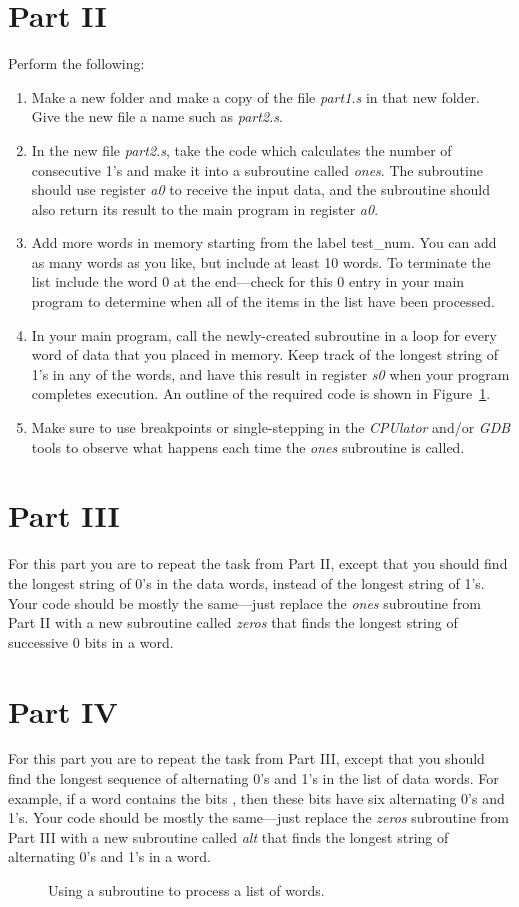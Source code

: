 \documentclass[epsfig,10pt,fullpage]{article}
\newcommand{\CommonDocsPath}{../../../../common/docs}
\begin{document}
\section*{Part II}
Perform the following:
\begin{enumerate}
\item Make a new folder and make a copy of the file {\it part1.s} in that new folder. Give
the new file a name such as {\it part2.s}.
\item In the new file {\it part2.s}, take the code which calculates the 
number of consecutive 1's and make it into a subroutine called {\it ones}. The subroutine 
should use register {\it a0} to receive the input data, and the subroutine should also 
return its result to the main program in register {\it a0}.
\item Add more words in memory starting from the label test\_num. You can add as many
words as you like, but include at least 10 words. To terminate the list include the word 0
at the end---check for this 0 entry in your main program to determine when all of the
items in the list have been processed.
\item In your main program, call the newly-created subroutine in a loop for every word of 
data that you placed in memory. Keep track of the longest string of 1's in any of the words, 
and have this result in register {\it s0} when your program completes execution. 
An outline of the required code is shown in Figure~\ref{fig:code2}.
\item Make sure to use breakpoints or single-stepping in the {\it CPUlator} and/or 
{\it GDB} tools to observe what happens each time the {\it ones} subroutine is called.
\end{enumerate}

\section*{Part III}
For this part you are to repeat the task from Part II, except that you should find the 
longest string of 0's in the data words, instead of the longest string of 1's. Your code
should be mostly the same---just replace the {\it ones} subroutine from Part II with a 
new subroutine called {\it zeros} that finds the longest string of successive 0 bits in a
word.

\section*{Part IV}
For this part you are to repeat the task from Part III, except that you should find the 
longest sequence of alternating 0's and 1's in the list of data words. For example, if a
word contains the bits {}, then these bits have six alternating 0's and 1's.
Your code should be mostly the same---just replace the {\it zeros} subroutine from Part III 
with a new subroutine called {\it alt} that finds the longest string of alternating 0's
and 1's in a word.

\begin{figure}[H]
\begin{center}

\end{center}
\caption{Using a subroutine to process a list of words.}
\label{fig:code2}
\end{figure}


\end{document}
